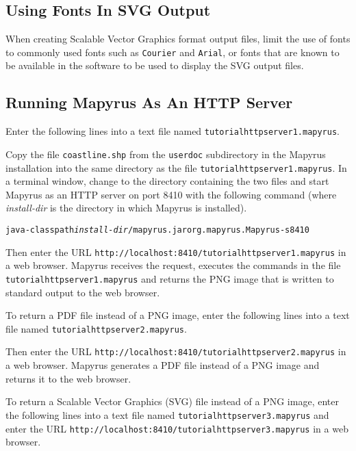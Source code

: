 \subsection{Using Fonts In SVG Output}
\label{svgfonts}

When creating Scalable Vector Graphics format output files,
limit the use of fonts to commonly used fonts such as \texttt{Courier}
and \texttt{Arial}, or fonts that are known to be available in the
software to be used to display the SVG output files.

\subsection{Running Mapyrus As An HTTP Server}
\label{tutorialhttpserver}

Enter the following lines into a text file named
\texttt{tutorialhttpserver1.mapyrus}.



Copy the file \texttt{coastline.shp} from the \texttt{userdoc}
subdirectory in the
Mapyrus installation into the same directory as the file
\texttt{tutorialhttpserver1.mapyrus}.  In a terminal window, change to the
directory containing the two files and start Mapyrus as an HTTP server on port
8410 with the following command
(where \textit{install-dir} is the directory in which Mapyrus is installed).

\begin{alltt}
java -classpath \textit{install-dir}/mapyrus.jar org.mapyrus.Mapyrus -s 8410
\end{alltt}

Then enter the URL \texttt{http://localhost:8410/tutorialhttpserver1.mapyrus} in a
web browser.  Mapyrus receives the request, executes the commands in the file
\texttt{tutorialhttpserver1.mapyrus} and returns the PNG image that is written to
standard output to the web browser.

To return a PDF file instead of a PNG image,
enter the following lines into a text file named
\texttt{tutorialhttpserver2.mapyrus}.



Then enter the URL \texttt{http://localhost:8410/tutorialhttpserver2.mapyrus}
in a web browser.  Mapyrus generates a PDF file instead of a PNG image and
returns it to the web browser.

To return a Scalable Vector Graphics (SVG) file instead of a PNG image,
enter the following lines into a text file named
\texttt{tutorialhttpserver3.mapyrus} and enter the URL
\texttt{http://localhost:8410/tutorialhttpserver3.mapyrus}
in a web browser.


